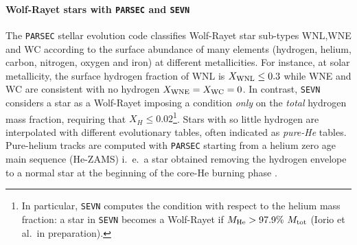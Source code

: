 \documentclass[a4paper,titlepage]{book}     	%
\begin{document}
\paragraph{Wolf-Rayet stars with \texttt{PARSEC} and \texttt{SEVN}} 
The \texttt{PARSEC} stellar evolution code classifies Wolf-Rayet star sub-types WNL,WNE and WC according to the surface abundance of many elements (hydrogen, helium, carbon, nitrogen, oxygen and iron) at different metallicities. For instance, at solar metallicity, the surface hydrogen fraction of WNL is $X_{\rm WNL} \leq 0.3$ while WNE and WC are consistent with no hydrogen $X_{\rm WNE} = X_{\rm WC} = 0$. In contrast, \texttt{SEVN} considers a star as a Wolf-Rayet imposing a condition \emph{only} on the \emph{total} hydrogen mass fraction, requiring that $X_H \leq 0.02$\footnote{In particular, \texttt{SEVN} computes the condition with respect to the helium mass fraction: a star in \texttt{SEVN} becomes a Wolf-Rayet if $M_{\rm He} > 97.9 \%~M_{\rm tot}$ (Iorio et al.\ in preparation).}. Stars with so little hydrogen are interpolated with different evolutionary tables, often indicated as \emph{pure-He} tables. Pure-helium tracks are computed with \texttt{PARSEC} starting from a helium zero age main sequence (He-ZAMS) i.\ e.\ a star obtained removing the hydrogen envelope to a normal star at the beginning of the core-He burning phase \cite{spera2019_mergingBBH}.\\
\end{document}
